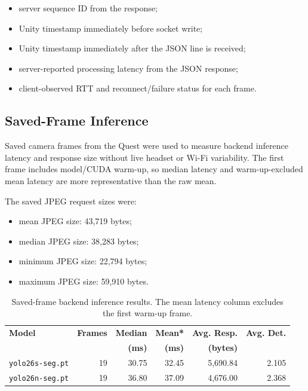 \documentclass[11pt]{article}
\begin{document}
\begin{itemize}
    \item server sequence ID from the response;
    \item Unity timestamp immediately before socket write;
    \item Unity timestamp immediately after the JSON line is received;
    \item server-reported processing latency from the JSON response;
    \item client-observed RTT and reconnect/failure status for each frame.
\end{itemize}

\subsection{Saved-Frame Inference}

Saved camera frames from the Quest were used to measure backend inference latency and response size without live headset or Wi-Fi variability. The first frame includes model/CUDA warm-up, so median latency and warm-up-excluded mean latency are more representative than the raw mean.

The saved JPEG request sizes were:

\begin{itemize}
    \item mean JPEG size: 43,719 bytes;
    \item median JPEG size: 38,283 bytes;
    \item minimum JPEG size: 22,794 bytes;
    \item maximum JPEG size: 59,910 bytes.
\end{itemize}

\begin{table}[H]
\centering
\small
\begin{tabular}{@{}lrrrrr@{}}
\toprule
\textbf{Model} & \textbf{Frames} & \textbf{Median} & \textbf{Mean*} & \textbf{Avg. Resp.} & \textbf{Avg. Det.} \\
 & & \textbf{(ms)} & \textbf{(ms)} & \textbf{(bytes)} & \\
\midrule
\texttt{yolo26s-seg.pt} & 19 & 30.75 & 32.45 & 5,690.84 & 2.105 \\
\texttt{yolo26n-seg.pt} & 19 & 36.80 & 37.09 & 4,676.00 & 2.368 \\
\bottomrule
\end{tabular}
\caption{Saved-frame backend inference results. The mean latency column excludes the first warm-up frame.}
\end{table}
\end{document}
